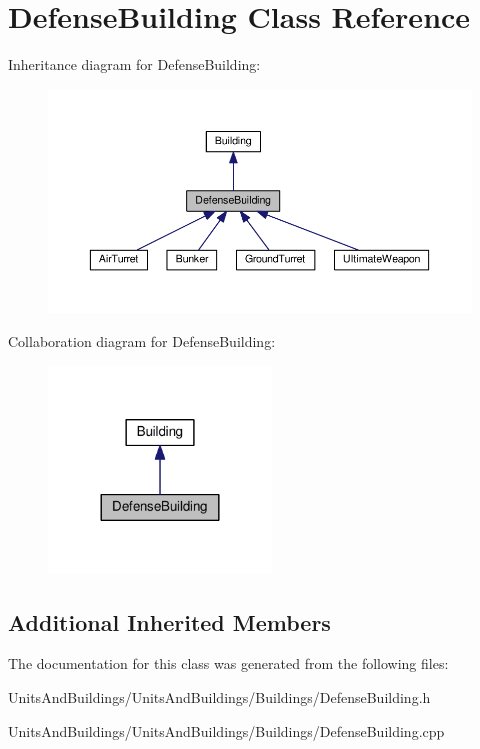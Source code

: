 \hypertarget{class_defense_building}{}\section{Defense\+Building Class Reference}
\label{class_defense_building}


Inheritance diagram for Defense\+Building\+:
\nopagebreak
\begin{figure}[H]
\begin{center}
\leavevmode
\includegraphics[width=350pt]{class_defense_building__inherit__graph}
\end{center}
\end{figure}


Collaboration diagram for Defense\+Building\+:
\nopagebreak
\begin{figure}[H]
\begin{center}
\leavevmode
\includegraphics[width=168pt]{class_defense_building__coll__graph}
\end{center}
\end{figure}
\subsection*{Additional Inherited Members}


The documentation for this class was generated from the following files\+:\begin{DoxyCompactItemize}
\item 
Units\+And\+Buildings/\+Units\+And\+Buildings/\+Buildings/Defense\+Building.\+h\item 
Units\+And\+Buildings/\+Units\+And\+Buildings/\+Buildings/Defense\+Building.\+cpp\end{DoxyCompactItemize}
